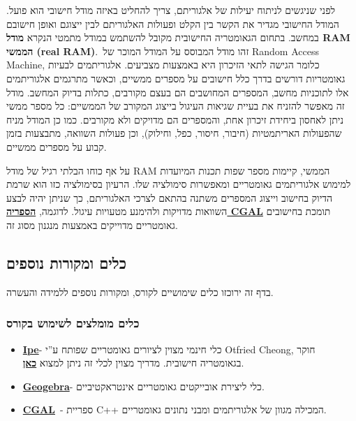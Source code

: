 \documentclass[
]{book}
\theoremstyle{definition}
\theoremstyle{definition}
\theoremstyle{definition}
\theoremstyle{definition}
\theoremstyle{remark}
\begin{document}
לפני שניגשים לניתוח יעילות של אלגוריתם, צריך להחליט באיזה מודל חישובי הוא פועל. המודל החישובי מגדיר את הקשר בין הקלט ופעולות האלגוריתם לבין ייצוגם ואופן חישובם במחשב. בתחום הגאומטריה החישובית מקובל להשתמש במודל מתמטי הנקרא \textbf{מודל RAM הממשי (real RAM)}.~זהו מודל המבוסס על המודל המוכר של Random Access Machine, כלומר הגישה לתאי הזיכרון היא באמצעות מצביעים. אלגוריתמים לבעיות גאומטריות דורשים בדרך כלל חישובים על מספרים ממשיים, וכאשר מתרגמים אלגוריתמים אלו לתוכניות מחשב, המספרים המחושבים הם בעצם מקורבים, כתלות בדיוק המחשב. מודל זה מאפשר להזניח את בעיית שגיאות העיגול בייצוג המקורב של הממשיים: כל מספר ממשי ניתן לאחסון ביחידת זיכרון אחת, והמספרים הם מדויקים ולא מקורבים. כמו כן המודל מניח שהפעולות האריתמטיות (חיבור, חיסור, כפל, וחילוק), וכן פעולות השוואה, מתבצעות בזמן קבוע על מספרים ממשיים.

על אף כוחו הבלתי רגיל של מודל RAM הממשי, קיימות מספר שפות תכנות המיועדות למימוש אלגוריתמים גאומטריים ומאפשרות סימולציה שלו. הרעיון בסימולציה כזו הוא שרמת הדיוק בחישוב וייצוג המספרים משתנה בהתאם לצרכי האלגוריתם, כך שניתן יהיה לבצע השוואות מדויקות ולהימנע מטעויות עיגול. לדוגמה, \href{https://www.cgal.org/}{\textbf{הספריה CGAL}} תומכת בחישובים גאומטריים מדוייקים באמצעות מנגנון מסוג זה.

\hypertarget{ux5dbux5dcux5d9ux5dd-ux5d5ux5deux5e7ux5d5ux5e8ux5d5ux5ea-ux5e0ux5d5ux5e1ux5e4ux5d9ux5dd}{%
\subsection*{\texorpdfstring{\textbf{כלים ומקורות נוספים}}{כלים ומקורות נוספים}}\label{ux5dbux5dcux5d9ux5dd-ux5d5ux5deux5e7ux5d5ux5e8ux5d5ux5ea-ux5e0ux5d5ux5e1ux5e4ux5d9ux5dd}}

בדף זה ירוכזו כלים שימושיים לקורס, ומקורות נוספים ללמידה והעשרה.

\hypertarget{ux5dbux5dcux5d9ux5dd-ux5deux5d5ux5deux5dcux5e6ux5d9ux5dd-ux5dcux5e9ux5d9ux5deux5d5ux5e9-ux5d1ux5e7ux5d5ux5e8ux5e1}{%
\subsubsection*{כלים מומלצים לשימוש בקורס}\label{ux5dbux5dcux5d9ux5dd-ux5deux5d5ux5deux5dcux5e6ux5d9ux5dd-ux5dcux5e9ux5d9ux5deux5d5ux5e9-ux5d1ux5e7ux5d5ux5e8ux5e1}}

\begin{itemize}
\item
  \href{https://ipe.otfried.org/}{\textbf{Ipe}}- כלי חינמי מצוין לציורים גאומטריים שפותח ע''י Otfried Cheong, חוקר בגאומטריה חישובית. מדריך מצוין לכלי זה ניתן למצוא \href{https://www.youtube.com/watch?v=moM4CATxTgw\&ab_channel=V\%C3\%A1clavBla\%C5\%BEej}{\textbf{כאן}}.
\item
  \href{https://www.geogebra.org/geometry}{\textbf{Geogebra}}- כלי ליצירת אובייקטים גאומטריים אינטראקטיביים.
\item
  \href{https://www.cgal.org/}{\textbf{CGAL}}~- ספריית C++ המכילה מגוון של אלגוריתמים ומבני נתונים גאומטריים.
\end{itemize}
\end{document}
